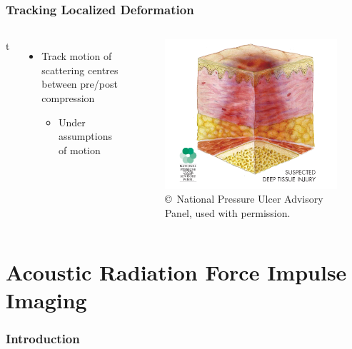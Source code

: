 \documentclass{beamer}
\begin{document}
		\begin{frame}
			\frametitle{Tracking Localized Deformation}
			\begin{columns}{t}
					\begin{itemize}
						\item Track motion of scattering centres between pre/post compression
						\begin{itemize}
							\item Under assumptions of motion
						\end{itemize}
					\end{itemize}

					\begin{figure}
						\centering
						\includegraphics[width=\textwidth]{../latex/assets/npuap/suspectedDTI.png}
						\caption{\copyright\ National Pressure Ulcer Advisory Panel, used with permission.}
					\end{figure}

			\end{columns}
		\end{frame}

	\section[ARFI]{Acoustic Radiation Force Impulse Imaging}
		\begin{frame}
			\frametitle{Introduction}
		\end{frame}
\end{document}
